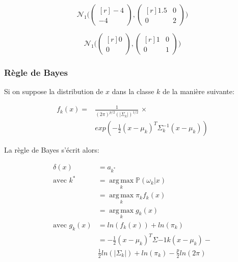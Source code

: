 \documentclass{article}
\begin{document}
\begin{multicols}{2}
\begin{equation}
    \mathcal{N}_1\Bigg(\begin{pmatrix*}[r]
        -4 \\
        -4
    \end{pmatrix*}, \begin{pmatrix*}[r]
        1.5 & 0 \\
        0 & 2
    \end{pmatrix*}\Bigg)
\end{equation}

\begin{equation}
    \mathcal{N}_1\Bigg(\begin{pmatrix*}[r]
        0 \\
        0
    \end{pmatrix*}, \begin{pmatrix*}[r]
        1 & 0 \\
        0 & 1
    \end{pmatrix*}\Bigg)
\end{equation}

\subsubsection{Règle de Bayes}\label{subsubsec:ex212}

Si on suppose la distribution de $x$ dans la classe $k$ de la manière suivante:

\begin{equation}
    \begin{split}
        f_k(x) = & \frac{1}{(2 \pi)^{p / 2}(|\Sigma_k|)^{1/2}} \, \times \\
                 & exp(-\frac{1}{2} (x - \mu_k)^{T} \Sigma^{-1}_k (x - \mu_k))
    \end{split}
\end{equation}

La règle de Bayes s'écrit alors:

\begin{equation}
    \begin{split}
        \delta(x) &= a_{k^*} \\
        \text{avec } k^* &= \operatorname*{arg\, max}_k \mathbb{P}(\omega_k | x) \\
                         &= \operatorname*{arg\, max}_k \pi_k f_k(x) \\
                         &= \operatorname*{arg\, max}_k g_k(x) \\
        \text{avec } g_k(x) &= ln(f_k(x)) + ln(\pi_k) \\
                            &= -\frac{1}{2} (x - \mu_k)^T \Sigma{-1}{k} (x - \mu_k) -\\
                            & \frac{1}{2} ln(|\Sigma_k|) + ln(\pi_k) - \frac{p}{2} ln(2 \pi)
    \end{split}
\end{equation}


\end{multicols}
\end{document}
